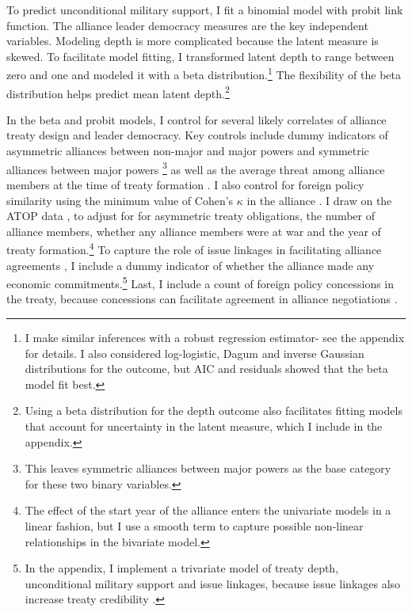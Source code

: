 \documentclass[12pt]{article}
\begin{document}
To predict unconditional military support, I fit a binomial model with probit link function. 
The alliance leader democracy measures are the key independent variables.
Modeling depth is more complicated because the latent measure is skewed.
To facilitate model fitting, I transformed latent depth to range between zero and one and modeled it with a beta distribution.\footnote{I make similar inferences with a robust regression estimator- see the appendix for details. I also considered log-logistic, Dagum and inverse Gaussian distributions for the outcome, but AIC and residuals showed that the beta model fit best.}
The flexibility of the beta distribution helps predict mean latent depth.\footnote{Using a beta distribution for the depth outcome also facilitates fitting models that account for uncertainty in the latent measure, which I include in the appendix.} 


In the beta and probit models, I control for several likely correlates of alliance treaty design and leader democracy. 
Key controls include dummy indicators of asymmetric alliances between non-major and major powers and symmetric alliances between major powers \citep{Mattes2012}\footnote{This leaves symmetric alliances between major powers as the base category for these two binary variables.} as well as the average threat among alliance members at the time of treaty formation \citep{LeedsSavun2007}. 
I also control for foreign policy similarity using the minimum value of Cohen's $\kappa$ in the alliance \citep{Hage2011}.
I draw on the ATOP data \citep{Leedsetal2002}, to adjust for for asymmetric treaty obligations, the number of alliance members, whether any alliance members were at war and the year of treaty formation.\footnote{The effect of the start year of the alliance enters the univariate models in a linear fashion, but I use a smooth term to capture possible non-linear relationships in the bivariate model.}  
To capture the role of issue linkages in facilitating alliance agreements \citep{Poast2012}, I include a dummy indicator of whether the alliance made any economic commitments.\footnote{In the appendix, I implement a trivariate model of treaty depth, unconditional military support and issue linkages, because issue linkages also increase treaty credibility \citep{ Poast2013}.}  
Last, I include a count of foreign policy concessions in the treaty, because concessions can facilitate agreement in alliance negotiations \citep{Johnson2015}. 
\end{document}

